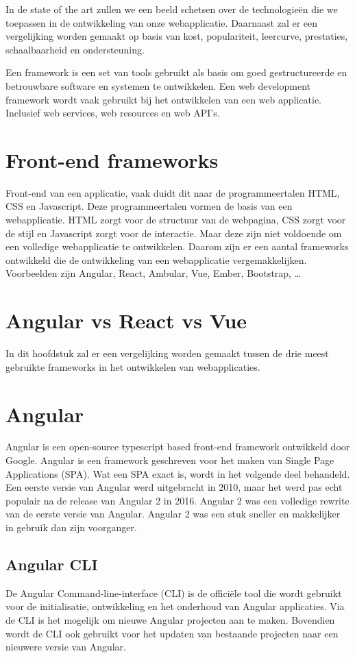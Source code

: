 In de state of the art zullen we een beeld schetsen over de technologieën die
we toepassen in de ontwikkeling van onze webapplicatie. Daarnaast zal er een
vergelijking worden gemaakt op basis van kost, populariteit, leercurve,
prestaties, schaalbaarheid en ondersteuning.

Een framework is een set van tools gebruikt als basis om goed gestructureerde
en betrouwbare software en systemen te ontwikkelen. Een web development
framework wordt vaak gebruikt bij het ontwikkelen van een web applicatie.
Inclusief web services, web resources en web API's.




\section*{Front-end frameworks}%
Front-end van een applicatie, vaak duidt dit naar de programmeertalen HTML, CSS
en Ja\-va\-script. Deze programmeertalen vormen de basis van een webapplicatie.
HTML zorgt voor de structuur van de webpagina, CSS zorgt voor de stijl en
Ja\-va\-script zorgt voor de interactie. Maar deze zijn niet voldoende om een
volledige webapplicatie te ontwikkelen. Daarom zijn er een aantal frameworks
ontwikkeld die de ontwikkeling van een webapplicatie vergemakkelijken.
Voorbeelden zijn Angular, React, Ambular, Vue, Ember, Bootstrap,
\ldots\autocite{Jaiswal2022}

\section*{Angular vs React vs Vue}%
In dit hoofdstuk zal er een vergelijking worden gemaakt tussen de drie meest
gebruikte frameworks in het ontwikkelen van webapplicaties.

\section*{Angular}%
Angular is een open-source typescript based front-end framework ontwikkeld door
Google. Angular is een framework geschreven voor het maken van Single Page
Applications (SPA). Wat een SPA exact is, wordt in het volgende deel behandeld.
\bigbreak Een eerste versie van Angular werd uitgebracht in 2010, maar het werd
pas echt populair na de release van Angular 2 in 2016. Angular 2 was een
volledige rewrite van de eerste versie van Angular. Angular 2 was een stuk
sneller en makkelijker in gebruik dan zijn voorganger. \autocite{DeNeve2021}

\subsection{Angular CLI}
De Angular Command-line-interface (CLI) is de officiële tool die wordt gebruikt
voor de initialisatie, ontwikkeling en het onderhoud van Angular applicaties.
Via de CLI is het mogelijk om nieuwe Angular projecten aan te maken. Bovendien
wordt de CLI ook gebruikt voor het updaten van bestaande projecten naar een
nieuwere versie van Angular.

